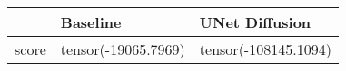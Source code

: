 \begin{tabular}{lll}
\toprule
{} &             Baseline &       UNet Diffusion  \\
\midrule
score &  tensor(-19065.7969) &  tensor(-108145.1094) \\
\bottomrule
\end{tabular}
